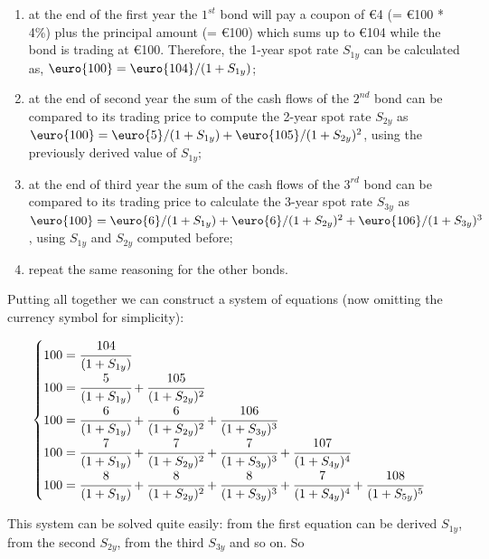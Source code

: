 \begin{enumerate}
\item at the end of the first year the $1^{st}$ bond will pay a coupon of \euro{4} (= \euro{100} * 4\%) plus the principal amount (= \euro{100}) which sums up to \euro{104} while the bond is trading at \euro{100}. Therefore, the 1-year spot rate $S_{1y}$ can be calculated as, $\mbox{\euro{100}} = \mbox{\euro{104}} / (1 + S_{1y})$;

\item at the end of second year the sum of the cash flows of the $2^{nd}$ bond can be compared to its trading price to compute the 2-year spot rate $S_{2y}$ as $\mbox{\euro{100}} = \mbox{\euro{5}} / (1 + S_{1y}) + \mbox{\euro{105}} / (1 + S_{2y})^{2}$, using the previously derived value of $S_{1y}$;

\item at the end of third year the sum of the cash flows of the $3^{rd}$ bond can be compared to its trading price to calculate the 3-year spot rate $S_{3y}$ as $\mbox{\euro{100}} = \mbox{\euro{6}} / (1 + S_{1y}) + \mbox{\euro{6}} / (1 + S_{2y})^{2} + \mbox{\euro{106}} / (1 + S_{3y})^{3}$, using $S_{1y}$ and $S_{2y}$ computed before;

\item repeat the same reasoning for the other bonds.
\end{enumerate}

Putting all together we can construct a system of equations (now omitting the currency symbol for simplicity):

\begin{equation*}
\begin{cases}
100 = \cfrac{104}{(1 + S_{1y})} \\
100 = \cfrac{5}{(1 + S_{1y})} + \cfrac{105}{(1 + S_{2y})^{2}} \\
100 = \cfrac{6} {(1 + S_{1y})} + \cfrac{6}{(1 + S_{2y})^{2}} + \cfrac{106} {(1 + S_{3y})^{3}} \\
100 = \cfrac{7} {(1 + S_{1y})} + \cfrac{7} {(1 + S_{2y})^{2}} + \cfrac{7} {(1 + S_{3y})^{3}} + \cfrac{107} {(1 + S_{4y})^{4}} \\
100 = \cfrac{8} {(1 + S_{1y})} + \cfrac{8} {(1 + S_{2y})^{2}}+ \cfrac{8} {(1 + S_{3y})^{3}} + \cfrac{7} {(1 + S_{4y})^{4}} + \cfrac{108} {(1 + S_{5y})^{5}}
\end{cases}
\end{equation*}

This system can be solved quite easily: from the first equation can be derived $S_{1y}$, from the second $S_{2y}$, from the third $S_{3y}$ and so on. So


